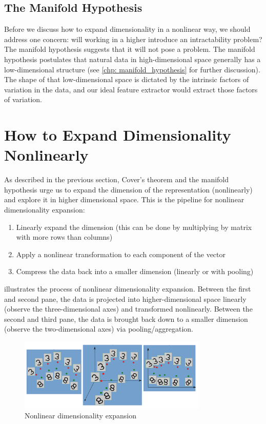 \subsection{The Manifold Hypothesis}

Before we discuss how to expand dimensionality in a nonlinear way, we should address one concern: will working in a higher introduce an intractability problem?
The manifold hypothesis suggests that it will not pose a problem.
The manifold hypothesis postulates that natural data in high-dimensional space generally has a low-dimensional structure (see \cref{chp: manifold_hypothesis} for further discussion).
The shape of that low-dimensional space is dictated by the intrinsic factors of variation in the data, and our ideal feature extractor would extract those factors of variation.

\section{How to Expand Dimensionality Nonlinearly}\label{sec: expand_dim}

As described in the previous section, Cover's theorem and the manifold hypothesis urge us to expand the dimension of the representation (nonlinearly) and explore it in higher dimensional space.
This is the pipeline for nonlinear dimensionality expansion:
\begin{enumerate}
    \item Linearly expand the dimension (this can be done by multiplying by matrix with more rows than columns)
    \item Apply a nonlinear transformation to each component of the vector
    \item Compress the data back into a smaller dimension (linearly or with pooling)
\end{enumerate}

 illustrates the process of nonlinear dimensionality expansion.
Between the first and second pane, the data is projected into higher-dimensional space linearly (observe the three-dimensional axes) and transformed nonlinearly.
Between the second and third pane, the data is brought back down to a smaller dimension (observe the two-dimensional axes) via pooling/aggregation.

\begin{figure}[ht]
\centering
\includegraphics[width=90mm]{figs/nonlinear_expansion.png}
\caption{Nonlinear dimensionality expansion}
\label{fig:nonlinear_expansion}
\end{figure}

